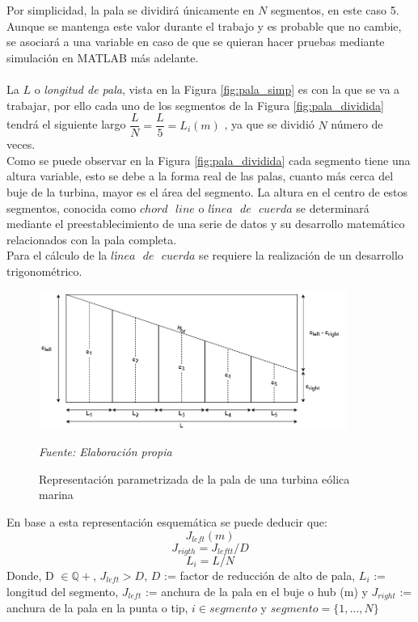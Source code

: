 Por simplicidad, la pala se dividirá únicamente en $N$ segmentos, en este caso 5. Aunque se mantenga este valor durante el trabajo y es probable que no cambie, se asociará a una variable en caso de que se quieran hacer pruebas mediante simulación en MATLAB más adelante. \\\\
    

La $L$ o \textit{longitud de pala}, vista en la Figura \ref{fig:pala_simp} es con la que se va a trabajar, por ello cada uno de los segmentos de la Figura \ref{fig:pala_dividida} tendrá el siguiente largo $\dfrac{L}{N} = \dfrac{L}{5} = L_i (m)$ , ya que se dividió $N$ número de veces. \\

Como se puede observar en la Figura \ref{fig:pala_dividida} cada segmento tiene una altura variable, esto se debe a la forma real de las palas, cuanto más cerca del buje de la turbina, mayor es el área del segmento. La altura en el centro de estos segmentos, conocida como $chord \text{ } line$ o $línea \text{ } de \text{ } cuerda$ se determinará mediante el preestablecimiento de una serie de datos y su desarrollo matemático relacionados con la pala completa.\\

Para el cálculo de la $línea \text{ } de \text{ } cuerda$ se requiere la realización de un desarrollo trigonométrico. 

\begin{figure}[H]
    \centering
    \includegraphics[width=0.9\textwidth]{images/planteo chord line.png}
    \caption{Representación parametrizada de la pala de una turbina eólica marina}
    \textit{Fuente: Elaboración propia}
    \label{fig:pala_desarrollo_chord}
\end{figure}



\begin{definicion}
En base a esta representación esquemática se puede deducir que:
$$ J_{left} (m)$$
$$ J_{rigth} = J_{leftt}/D$$
$$ L_i = L/N$$
Donde,
\centering
D $\in \mathbb{Q+}$, \hspace{2pt} $J_{left} > D$, $D$ := factor de reducción de alto de pala,  \hspace{2pt} $L_i$ := longitud del segmento,  $J_{left}$ := anchura de la pala en el buje o hub (m) y $J_{right}$ := anchura de la pala en la punta o tip, $i \in segmento$ y $segmento = \{1, ..., N\}$ 
\label{def_laterales_pala}
\end{definicion}

